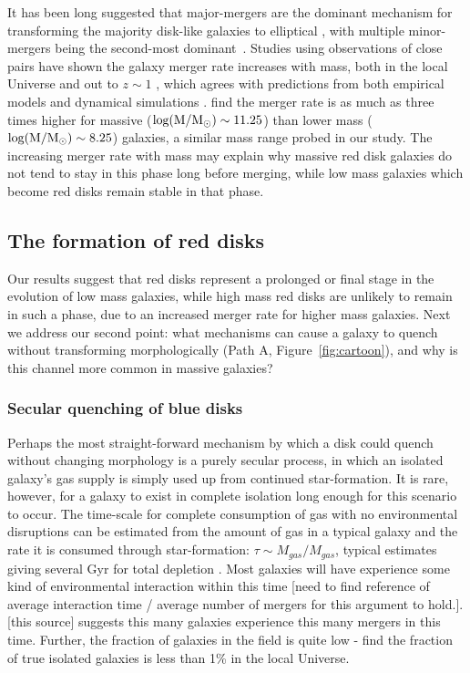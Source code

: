 \documentclass[useAMS,usenatbib]{mn2e}
\begin{document}
It has been long suggested that major-mergers are the dominant mechanism for transforming the majority disk-like galaxies to elliptical \citep{Toomre1977,Schweizer1982,Schweizer1990}, with multiple minor-mergers being the second-most dominant~\citep{Bundy2009,Hopkins2010b}. Studies using observations of close pairs have shown the galaxy merger rate increases with mass, both in the local Universe \citep{Xu2004,Patton2008,Domingue2009,Robotham2014,Casteels2014} and out to $z\sim1$ \citep{Xu2012,Bundy2009}, which agrees with predictions from both empirical models and dynamical simulations \citep{Hopkins2010a,Hopkins2010b,Maller2006}. \citet{Casteels2014} find the merger rate is as much as three times higher for massive ($\rm log(M/M_{\odot})\sim11.25$) than lower mass ($\rm log(M/M_{\odot})\sim8.25$) galaxies, a similar mass range probed in our study. The increasing merger rate with mass may explain why massive red disk galaxies do not tend to stay in this phase long before merging, while low mass galaxies which become red disks remain stable in that phase. 


\subsection{The formation of red disks}

Our results suggest that red disks represent a prolonged or final stage in the evolution of low mass galaxies, while high mass red disks are unlikely to remain in such a phase, due to an increased merger rate for higher mass galaxies. Next we address our second point: what mechanisms can cause a galaxy to quench without transforming morphologically (Path A, Figure~\ref{fig:cartoon}), and why is this channel more common in massive galaxies? 
 
\subsubsection{Secular quenching of blue disks}

Perhaps the most straight-forward mechanism by which a disk could quench without changing morphology is a purely secular process, in which an isolated galaxy's gas supply is simply used up from continued star-formation. It is rare, however, for a galaxy to exist in complete isolation long enough for this scenario to occur. The time-scale for complete consumption of gas with no environmental disruptions can be estimated from the amount of gas in a typical galaxy and the rate it is consumed through star-formation: $\tau \sim M_{gas}/{M}_{gas}$, typical estimates giving several Gyr for total depletion \citep{Larson1980,Kaviraj2011,Hatton2003,Schawinski2014}. Most galaxies will have experience some kind of environmental interaction within this time [need to find reference of average interaction time / average number of mergers for this argument to hold.]. [this source] suggests this many galaxies experience this many mergers in this time. Further, the fraction of galaxies in the field is quite low - \citet{Tully1987} find the fraction of true isolated galaxies is less than 1\% in the local Universe. 
\end{document}
